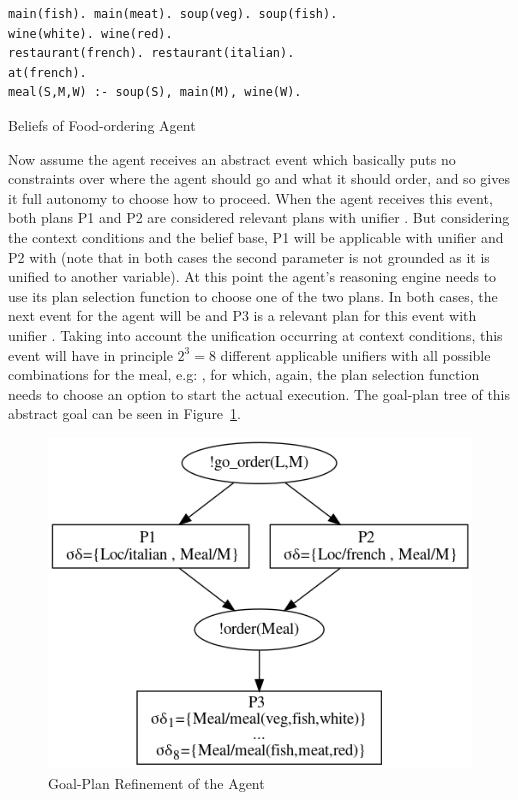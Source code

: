\begin{listing}[!htb]
\centering
\begin{tcolorbox}[left=2pt,right=2pt,top=2pt,bottom=2pt,arc=0pt,
                  boxrule=0pt,toprule=1pt,
                  colback=white]
\begin{verbatim}
main(fish). main(meat). soup(veg). soup(fish).
wine(white). wine(red).
restaurant(french). restaurant(italian).
at(french).
meal(S,M,W) :- soup(S), main(M), wine(W).
\end{verbatim}
\end{tcolorbox}
    \caption{Beliefs of Food-ordering Agent}
    \label{lst:beliefs_1}

\end{listing}


Now assume the agent receives an abstract event  which basically puts no constraints over where the agent should go and what it should order, and so gives it full autonomy to choose how to proceed. When the agent receives this event, both plans P1 and P2 are considered relevant plans with unifier . But considering the context conditions and the belief base, P1 will be applicable with unifier  and P2 with  (note that in both cases the second parameter is not grounded as it is unified to another variable). At this point the agent's reasoning engine needs to use its plan selection function to choose one of the two plans. In both cases, the next event for the agent will be  and P3 is a relevant plan for this event with unifier .  Taking into account the unification occurring at context conditions, this event will have in principle $2^3 = 8$ different applicable unifiers with all possible combinations for the meal, e.g: , for which, again, the plan selection function needs to choose an option to start the actual execution. The goal-plan tree of this abstract goal can be seen in Figure~\ref{fig:gp-tree}.

\begin{figure}[!t]
  \centering
  \includegraphics[width=0.70\linewidth]{ch_aamas2021/outfile.png}
  \caption{Goal-Plan Refinement of the Agent}
  \label{fig:gp-tree}
\end{figure}

